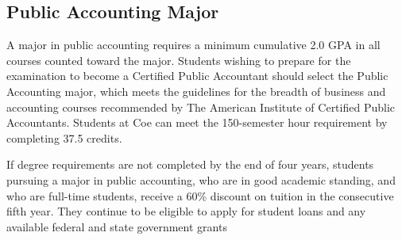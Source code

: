 \documentclass[
  letterpaper,
]{scrbook}
\begin{document}
\subsection{Public Accounting Major}\label{public-accounting-major}

A major in public accounting requires a minimum cumulative 2.0 GPA in
all courses counted toward the major. Students wishing to prepare for
the examination to become a Certified Public Accountant should select
the Public Accounting major, which meets the guidelines for the breadth
of business and accounting courses recommended by The American Institute
of Certified Public Accountants. Students at Coe can meet the
150-semester hour requirement by completing 37.5 credits.

If degree requirements are not completed by the end of four years,
students pursuing a major in public accounting, who are in good academic
standing, and who are full-time students, receive a 60\% discount on
tuition in the consecutive fifth year. They continue to be eligible to
apply for student loans and any available federal and state government
grants
\end{document}
